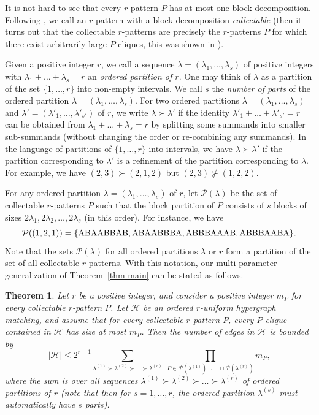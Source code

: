 \documentclass{aic}
\newtheorem{theorem}{Theorem}[section]
\theoremstyle{definition}
\numberwithin{equation}{section}
\numberwithin{figure}{section}
\newcommand{\HH}{\mathcal{H}}
\newcommand{\PP}{\mathcal{P}}
\begin{document}
It is not hard to see that every $r$-pattern $P$ has at most one block decomposition. Following \cite{DGR}, we call an $r$-pattern with a block decomposition \emph{collectable} (then it turns out that the collectable $r$-patterns are precisely the $r$-patterns $P$ for which there exist arbitrarily large $P$-cliques, this was shown in \cite{DGR}).

Given a positive integer $r$, we call a sequence $\lambda=(\lambda_1,\dots,\lambda_s)$ of positive integers with $\lambda_1+\dots+\lambda_s=r$ an \emph{ordered partition of $r$}. One may think of $\lambda$ as a partition of the set $\{1,\dots,r\}$ into non-empty intervals. We call $s$ the \emph{number of parts} of the ordered partition $\lambda=(\lambda_1,\dots,\lambda_s)$. For two ordered partitions $\lambda=(\lambda_1,\dots,\lambda_s)$ and $\lambda'=(\lambda'_1,\dots,\lambda'_{s'})$ of $r$, we write $\lambda \succ \lambda'$ if the identity $\lambda'_1+\dots+\lambda'_{s'}=r$ can be obtained from $\lambda_1+\dots+\lambda_s=r$ by splitting some summands into smaller sub-summands (without changing the order or re-combining any summands). In the language of partitions of $\{1,\dots,r\}$ into intervals, we have $\lambda \succ \lambda'$ if the partition corresponding to $\lambda'$ is a refinement of the partition corresponding to $\lambda$. For example, we have $(2,3) \succ (2,1,2)$ but $(2,3) \not\succ (1,2,2)$.

For any ordered partition $\lambda=(\lambda_1,\dots,\lambda_s)$ of $r$, let $\PP(\lambda)$ be the set of collectable $r$-patterns $P$ such that the block partition of $P$ consists of $s$ blocks of sizes $2\lambda_1,2\lambda_2,\dots,2\lambda_s$ (in this order). For instance, we have 
\[
\PP((1,2,1)) = \{\rm{ABAABBAB, ABAABBBA, ABBBAAAB, ABBBAABA}\}.
\]
Note that the sets $\PP(\lambda)$ for all ordered partitions $\lambda$ or $r$ form a partition of the set of all collectable $r$-patterns.
With this notation, our multi-parameter generalization of Theorem~\ref{thm-main} can be stated as follows. 

\begin{theorem} \label{thm-paramteters-upper-bound}
Let $r$ be a positive integer, and consider a positive integer $m_P$ for every collectable $r$-pattern $P$. Let $\HH$ be an ordered $r$-uniform hypergraph matching, and assume that for every collectable $r$-pattern $P$, every $P$-clique contained in $\HH$ has size at most $m_P$. Then the number of edges in $\HH$ is bounded by
\begin{equation}\label{eq_main_upper}
|\HH|\le 2^{r-1} \sum_{\lambda^{(1)} \succ \lambda^{(2)} \succ \dots \succ \lambda^{(r)}}\ \prod_{P\in \PP(\lambda^{(1)})\cup\dots\cup \PP(\lambda^{(r)})} m_{P},
\end{equation}
where the sum is over all sequences $\lambda^{(1)} \succ \lambda^{(2)} \succ \dots \succ \lambda^{(r)}$ of ordered partitions of $r$ (note that then for $s=1,\dots,r$, the ordered partition $\lambda^{(s)}$ must automatically have $s$ parts).
\end{theorem}
\end{document}
